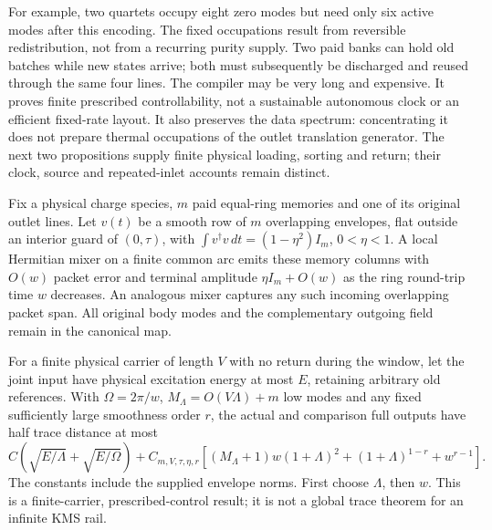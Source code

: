 For example, two quartets occupy eight zero modes but need only six
active modes after this encoding. The fixed occupations result
from reversible redistribution, not from a recurring purity supply.
Two paid banks can hold old batches while new states arrive; both
must subsequently be discharged and reused through the same four
lines. The compiler may be very long and expensive. It proves
finite prescribed controllability, not a sustainable autonomous
clock or an efficient fixed-rate layout. It also preserves the
data spectrum: concentrating it does not prepare thermal
occupations of the outlet translation generator. The next two
propositions supply finite physical loading, sorting and return;
their clock, source and repeated-inlet accounts remain distinct.

\begin{proposition}
\label{prop:packet-interface}
Fix a physical charge species, $m$ paid equal-ring memories and one
of its original outlet lines. Let $v(t)$ be a smooth row of $m$
overlapping envelopes, flat outside an interior guard of $(0,\tau)$,
with $\int v^\dagger v\,dt=(1-\eta^2)I_m$, $0<\eta<1$.
A local Hermitian mixer on a finite common arc emits these memory
columns with $O(w)$ packet error and terminal amplitude
$\eta I_m+O(w)$ as the ring round-trip time $w$ decreases.
An analogous mixer captures any such incoming overlapping packet
span. All original body modes and the complementary outgoing field
remain in the canonical map.

For a finite physical carrier of length $V$ with no return during
the window, let the joint input have physical excitation energy at
most $E$, retaining arbitrary old references. With
$\Omega=2\pi/w$, $M_\Lambda=O(V\Lambda)+m$ low modes and any
fixed sufficiently large smoothness order $r$, the actual and
comparison full outputs have half trace distance at most
\begin{equation}
 C\left(\sqrt{E/\Lambda}+\sqrt{E/\Omega}\right)
 +C_{m,V,\tau,\eta,r}\left[
 (M_\Lambda+1)w(1+\Lambda)^2
 +(1+\Lambda)^{1-r}+w^{r-1}\right].
 \label{eq:packet-joint-error}
\end{equation}
The constants include the supplied envelope norms. First choose
$\Lambda$, then $w$. This is a finite-carrier, prescribed-control
result; it is not a global trace theorem for an infinite KMS rail.
\end{proposition}
